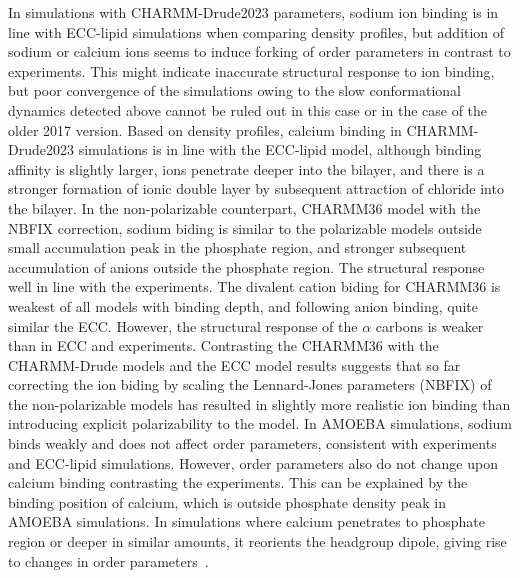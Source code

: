 \documentclass[journal=jacsat,manuscript=article,layout=singlecolumn]{achemso}
\begin{document}
In simulations with CHARMM-Drude2023 parameters, sodium ion binding is in line with ECC-lipid simulations when comparing density profiles,
but addition of sodium or calcium ions seems to induce forking of order parameters in contrast to experiments. 
This might indicate inaccurate structural response to ion binding, but poor convergence of the simulations owing to the slow conformational dynamics detected above cannot be ruled out in this case or in the case of the older 2017 version.
Based on density profiles, calcium binding in CHARMM-Drude2023 simulations is in line with the ECC-lipid model, although binding affinity is slightly larger, 
ions penetrate 
deeper into the bilayer, and there is a stronger formation of ionic double layer by subsequent attraction of chloride into the bilayer.  
In the non-polarizable counterpart, CHARMM36 model with the NBFIX correction, sodium biding is similar to the polarizable models outside small accumulation peak in the phosphate region, and stronger subsequent accumulation of anions outside the phosphate region. The structural response well in line with the experiments. The divalent cation biding for CHARMM36 is weakest of all models with binding depth, and following anion binding, quite similar the ECC. However, the structural response of the $\alpha$ carbons is weaker than in ECC and experiments. Contrasting the CHARMM36 with the CHARMM-Drude models and the ECC model results suggests that so far correcting the ion biding by scaling the Lennard-Jones parameters (NBFIX) of the non-polarizable models has resulted in slightly more realistic ion binding than introducing explicit polarizability to the model. 
In AMOEBA simulations, sodium binds weakly and does not affect order parameters, consistent with experiments and ECC-lipid simulations. However, order parameters also do not change upon calcium binding contrasting the experiments. This can be explained by the binding position of calcium, which is outside phosphate density peak in AMOEBA simulations. In simulations where calcium penetrates to phosphate region or deeper in similar amounts, it reorients the headgroup dipole, giving rise to changes in order parameters~\cite{Catte2016}. 
\end{document}
